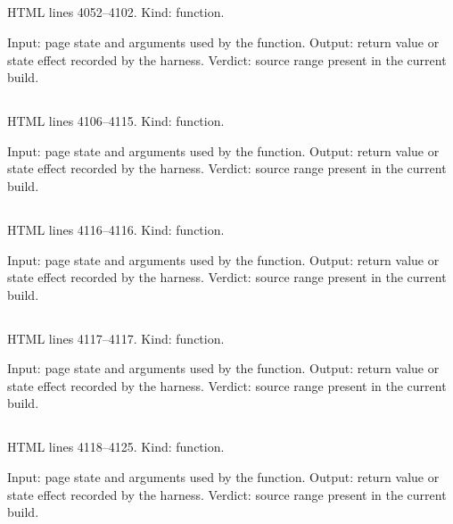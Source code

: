 \subsection*{\texttt{}}
\label{vf_140_edsDerived}
HTML lines 4052--4102. Kind: function.

Input: page state and arguments used by the function.
Output: return value or state effect recorded by the harness.
Verdict: source range present in the current build.

\subsection*{\texttt{}}
\label{vf_141_pseudonymMap}
HTML lines 4106--4115. Kind: function.

Input: page state and arguments used by the function.
Output: return value or state effect recorded by the harness.
Verdict: source range present in the current build.

\subsection*{\texttt{}}
\label{vf_142_pseudoOn}
HTML lines 4116--4116. Kind: function.

Input: page state and arguments used by the function.
Output: return value or state effect recorded by the harness.
Verdict: source range present in the current build.

\subsection*{\texttt{}}
\label{vf_143_exportName}
HTML lines 4117--4117. Kind: function.

Input: page state and arguments used by the function.
Output: return value or state effect recorded by the harness.
Verdict: source range present in the current build.

\subsection*{\texttt{}}
\label{vf_144_pseudoRun}
HTML lines 4118--4125. Kind: function.

Input: page state and arguments used by the function.
Output: return value or state effect recorded by the harness.
Verdict: source range present in the current build.

